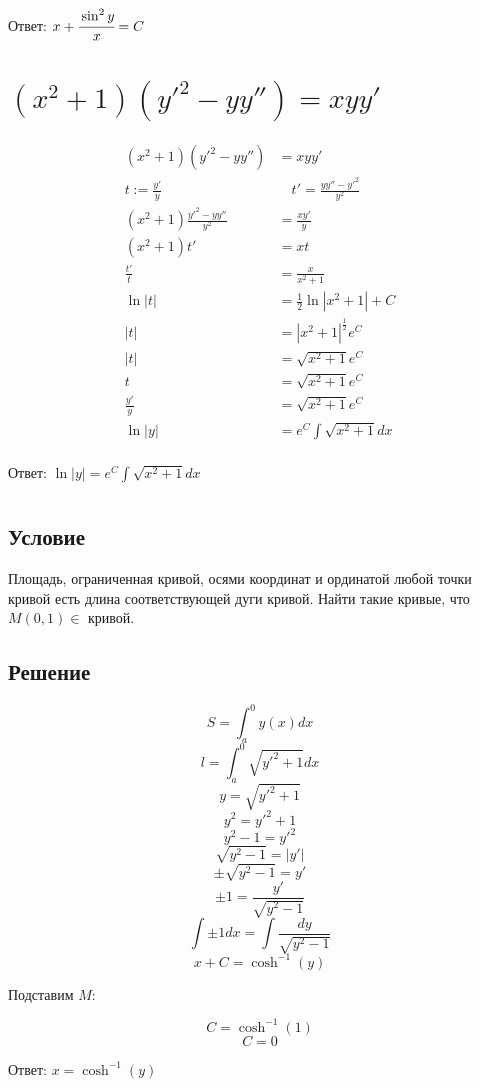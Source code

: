 Ответ: \(x + \cfrac{\sin^2 y}{x} = C\)

\section{\((x^2+1)(y'^2-yy'') = xyy'\)}

\begin{align*}
    (x^2+1)(y'^2-yy'')           & = xyy'                             \\
    t := \frac{y'}{y}            & \quad t' = \frac{yy'' - y'^2}{y^2} \\
    (x^2+1)\frac{y'^2-yy''}{y^2} & = \frac{xy'}{y}                    \\
    (x^2+1)t'                    & = xt                               \\
    \frac{t'}{t}                 & = \frac{x}{x^2+1}                  \\
    \ln |t|                      & = \frac{1}{2}\ln|x^2+1|+C          \\
    |t|                          & = |x^2+1|^\frac{1}{2}e^C           \\
    |t|                          & = \sqrt{x^2+1}e^C                  \\
    t                            & = \sqrt{x^2+1}e^C                  \\
    \frac{y'}{y}                 & = \sqrt{x^2+1}e^C                  \\
    \ln |y|                      & = e^C\int \sqrt{x^2+1} dx          \\
\end{align*}

Ответ: \(\ln |y| = e^C\int \sqrt{x^2+1} dx\)

\section{}

\subsection*{Условие}

Площадь, ограниченная кривой, осями координат и ординатой любой точки кривой есть длина соответствующей дуги кривой. Найти такие кривые, что $M(0, 1)\in$ кривой.

\subsection*{Решение}

\[S = \int_{a}^{0} y(x) dx \]
\[l = \int_{a}^{0} \sqrt{y'^2 + 1} dx\]
\[y = \sqrt{y'^2 + 1}\]
\[y^2 = y'^2 + 1\]
\[y^2-1 = y'^2\]
\[\sqrt{y^2-1} = |y'|\]
\[\pm\sqrt{y^2-1} = y'\]
\[\pm1 = \frac{y'}{\sqrt{y^2-1}}\]
\[\int \pm1 dx = \int \frac{dy}{\sqrt{y^2-1}}\]
\[x + C = \cosh^{-1} (y)\]

Подставим $M$:

\[C = \cosh^{-1} (1)\]
\[C = 0\]

Ответ: \(x = \cosh^{-1} (y)\)

